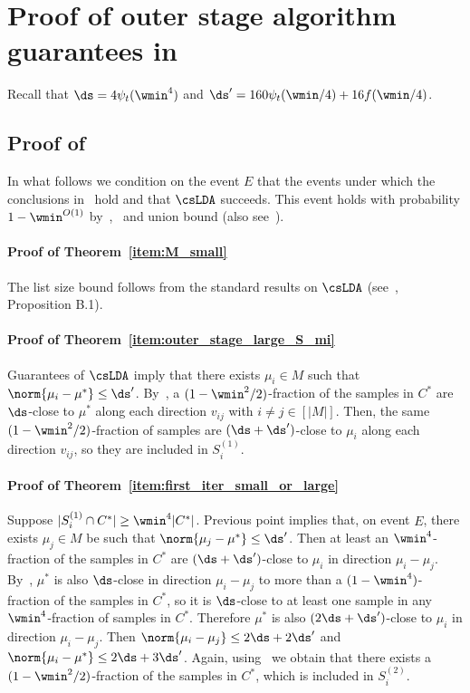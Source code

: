 \section{Proof of outer stage algorithm guarantees in~}\label{sec:outer-stage}
Recall that $\ds = 4\psi_t(\wmin^4)$ and $\ds' = 160\psi_t(\wmin/4) + 16f(\wmin/4)$.

\subsection{Proof of~}
In what follows we condition on the event $E$ that the events under which the conclusions in~ hold and that \(\csLDA\) succeeds. This event holds with probability \(1 - \wmin^{O(1)}\) by~,~ and union bound (also see~).
\paragraph{Proof of Theorem~\ref{item:M_small}}
The list size bound follows from the standard results on \(\csLDA\) (see~\cite{diakonikolas2018list}, Proposition B.1). 
\paragraph{Proof of Theorem~\ref{item:outer_stage_large_S_mi}}
Guarantees of \(\csLDA\) imply that there exists $\mu_i \in M$ such that $\norm{\mu_i - \mu^*} \leq \ds'$. By~, a $(1-\wmin^2/2)$-fraction of the samples in $C^*$ are $\ds$-close to $\mu^*$ along each direction $v_{ij}$ with $i \neq j \in [|M|]$.
Then, the same $(1-\wmin^2/2)$-fraction of samples are $(\ds+\ds')$-close to $\mu_i$ along each direction $v_{ij}$, so they are included in $S_i^{(1)}$.
\paragraph{Proof of Theorem~\ref{item:first_iter_small_or_large}}
Suppose $|S_i^{(1)} \cap C^*| \geq \wmin^4 |C^*|$.
    Previous point implies that, on event \(E\), there exists $\mu_j \in M$ be such that $\norm{\mu_j - \mu^*} \leq \ds'$.
    Then at least an $\wmin^4$-fraction of the samples in $C^*$ are $(\ds+\ds')$-close to $\mu_i$ in direction $\mu_i - \mu_j$.
    By~, $\mu^*$ is also $\ds$-close in direction $\mu_i - \mu_j$ to more than a $(1-\wmin^4)$-fraction of the samples in $C^*$, so it is $\ds$-close to at least one sample in any $\wmin^4$-fraction of samples in $C^*$.
    Therefore $\mu^*$ is also $(2\ds+\ds')$-close to $\mu_i$ in direction $\mu_i - \mu_j$.
    Then $\norm{\mu_i - \mu_j} \leq 2\ds+2\ds'$ and $\norm{\mu_i - \mu^*} \leq 2\ds+3\ds'$.
    Again, using~ we obtain that there exists a  $(1-\wmin^2/2)$-fraction of the samples in $C^*$, which is included in \(S_i^{(2)}\).
